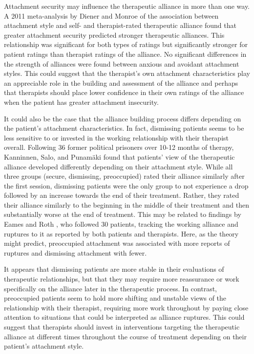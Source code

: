 \documentclass[12pt]{report}
\begin{document}
Attachment security may influence the therapeutic alliance in more than one way.
A 2011 meta-analysis by Diener and Monroe \cite{Diener2011} of the association between attachment style and self- and therapist-rated therapeutic alliance found that greater attachment security predicted stronger therapeutic alliances. This relationship was significant for both types of ratings but significantly stronger for patient ratings than therapist ratings of the alliance.
No significant differences in the strength of alliances were found between anxious and avoidant attachment styles.
This could suggest that the therapist's own attachment characteristics play an appreciable role in the building and assessment of the alliance and perhaps that therapists should place lower confidence in their own ratings of the alliance when the patient has greater attachment insecurity.

It could also be the case that the alliance building process differs depending on the patient's attachment characteristics.
In fact, dismissing patients seems to be less sensitive to or invested in the working relationship with their therapist overall. Following 36 former political prisoners over 10-12 months of therapy, Kanninnen, Salo, and Punamäki \cite{Kanninen2000} found that patients' view of the therapeutic alliance developed differently depending on their attachment style.
While all three groups (secure, dismissing, preoccupied) rated their alliance similarly after the first session, dismissing patients were the only group to not experience a drop followed by an increase towards the end of their treatment. Rather, they rated their alliance similarly to the beginning in the middle of their treatment and then substantially worse at the end of treatment.
This may be related to findings by Eames and Roth \cite{Eames2000}, who followed 30 patients, tracking the working alliance and ruptures to it as reported by both patients and therapists. Here, as the theory might predict, preoccupied attachment was associated with more reports of ruptures and dismissing attachment with fewer.

It appears that dismissing patients are more stable in their evaluations of therapeutic relationships, but that they may require more reassurance or work specifically on the alliance later in the therapeutic process.
In contrast, preoccupied patients seem to hold more shifting and unstable views of the relationship with their therapist, requiring more work throughout by paying close attention to situations that could be interpreted as alliance ruptures.
This could suggest that therapists should invest in interventions targeting the therapeutic alliance at different times throughout the course of treatment depending on their patient's attachment style.
\end{document}
